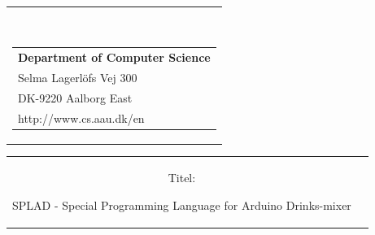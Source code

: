 


% 

\begin{nopagebreak}
{\samepage
\hspace{8cm}
\begin{tabular}{r}
\parbox{\textwidth}{  
\hfill
\\
\parbox{8cm}{\begin{tabular}{l}
{\small \textbf{Department of Computer Science}}\\
{\small Selma Lagerlöfs Vej 300} \\
{\small DK-9220 Aalborg East} \\
{\small http://www.cs.aau.dk/en}
\end{tabular}}}

\end{tabular}
\hspace{0cm}

\vspace{-5cm}
\begin{tabular}{cc}
\parbox{7cm}{
\begin{description}

\item {Titel:} 

SPLAD - Special Programming Language for Arduino Drinks-mixer


\end{description}}
\end{tabular}}
\end{nopagebreak}
